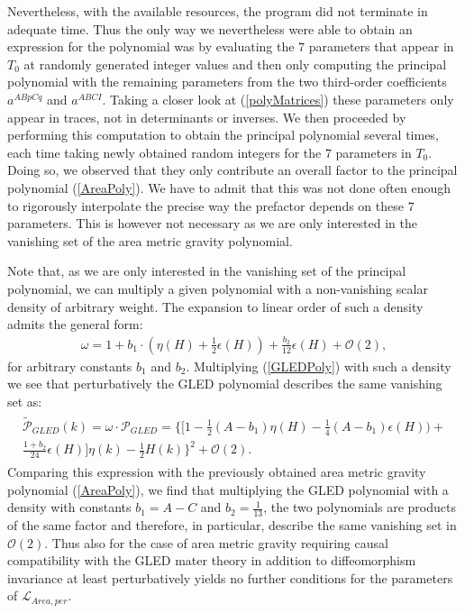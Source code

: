 Nevertheless, with the available resources, the program did not terminate in adequate time. Thus the only way we nevertheless were able to obtain an expression for the polynomial was by evaluating the $7$ parameters that appear in $T_0$ at randomly generated integer values and then only computing the principal polynomial with the remaining parameters from the two third-order coefficients $a^{ABpCq}$ and $a^{ABCI}$. Taking a closer look at (\ref{polyMatrices}) these parameters only appear in traces, not in determinants or inverses. We then proceeded by performing this computation to obtain the principal polynomial several times, each time taking newly obtained random integers for the $7$ parameters in $T_0$. Doing so, we observed that they only contribute an overall factor to the principal polynomial (\ref{AreaPoly}). We have to admit that this was not done often enough to rigorously interpolate the precise way the prefactor depends on these $7$ parameters. This is however not necessary as we are only interested in the vanishing set of the area metric gravity polynomial. 

Note that, as we are only interested in the vanishing set of the principal polynomial, we can multiply a given polynomial with a non-vanishing scalar density of arbitrary weight. The expansion to linear order of such a density admits the general form:
\begin{align}\label{dens}
\omega = 1+ b_1 \cdot (\eta(H) + \frac{1}{2} \epsilon(H)) + \frac{b_2}{12}\epsilon(H) + \mathcal{O}(2),
\end{align}
for arbitrary constants $b_1$ and $b_2$.
Multiplying  (\ref{GLEDPoly}) with such a density we see that perturbatively the GLED polynomial describes the same vanishing set as:
\begin{align} \label{GLEDPoly2}
\begin{aligned}
    \widetilde{\mathcal{P}}_{GLED}(k) = \omega \cdot \mathcal{P}_{GLED} = 
    \bigl\{  \bigl[ 1 - \frac{1}{2} (A-b_1) \eta(H) - \frac{1}{4} (A-b_1) \epsilon(H)) + \\ \frac{1+b_2}{24} \epsilon(H) \bigr] \eta(k)
    -\frac{1}{2} H(k)       \bigr\}^2 + \mathcal{O}(2).
\end{aligned}
\end{align}
Comparing this expression with the previously obtained area metric gravity polynomial (\ref{AreaPoly}), we find that multiplying the GLED polynomial with a density with constants $b_1 = A -C$ and $b_2 = \frac{1}{13}$, the two polynomials are products of the same factor and therefore, in particular, describe the same vanishing set in $\mathcal{O}(2)$. Thus also for the case of area metric gravity requiring causal compatibility with the GLED mater theory in addition to diffeomorphism invariance at least perturbatively yields no further conditions for the parameters of $\mathcal{L}_{Area,per}$.

